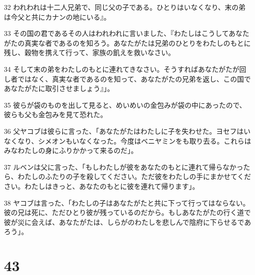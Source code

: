\par 32 われわれは十二人兄弟で、同じ父の子である。ひとりはいなくなり、末の弟は今父と共にカナンの地にいる』。
\par 33 その国の君であるその人はわれわれに言いました、『わたしはこうしてあなたがたの真実な者であるのを知ろう。あなたがたは兄弟のひとりをわたしのもとに残し、穀物を携えて行って、家族の飢えを救いなさい。
\par 34 そして末の弟をわたしのもとに連れてきなさい。そうすればあなたがたが回し者ではなく、真実な者であるのを知って、あなたがたの兄弟を返し、この国であなたがたに取引させましょう』」。
\par 35 彼らが袋のものを出して見ると、めいめいの金包みが袋の中にあったので、彼らも父も金包みを見て恐れた。
\par 36 父ヤコブは彼らに言った、「あなたがたはわたしに子を失わせた。ヨセフはいなくなり、シメオンもいなくなった。今度はベニヤミンをも取り去る。これらはみなわたしの身にふりかかって来るのだ」。
\par 37 ルベンは父に言った、「もしわたしが彼をあなたのもとに連れて帰らなかったら、わたしのふたりの子を殺してください。ただ彼をわたしの手にまかせてください。わたしはきっと、あなたのもとに彼を連れて帰ります」。
\par 38 ヤコブは言った、「わたしの子はあなたがたと共に下って行ってはならない。彼の兄は死に、ただひとり彼が残っているのだから。もしあなたがたの行く道で彼が災に会えば、あなたがたは、しらがのわたしを悲しんで陰府に下らせるであろう」。

\chapter{43}

